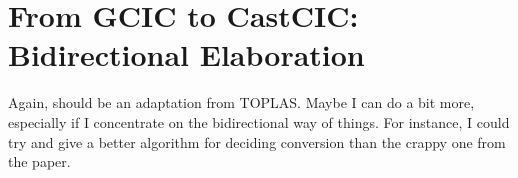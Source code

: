 \chapter{From GCIC to CastCIC: Bidirectional Elaboration}
\label{chap:bidir-gradual-elab}

Again, should be an adaptation from TOPLAS. Maybe I can do a bit more, especially if
I concentrate on the bidirectional way of things. For instance, I could try and give a better algorithm for deciding conversion than the crappy one from the paper.